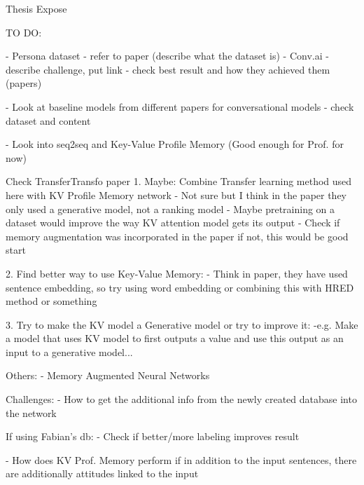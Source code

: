 Thesis Expose

TO DO:

- Persona dataset - refer to paper (describe what the dataset is)
- Conv.ai - describe challenge, put link
				- check best result and how they achieved them (papers)

				
- Look at baseline models from different papers for conversational models
	- check dataset and content 
	
- Look into seq2seq and Key-Value Profile Memory (Good enough for Prof. for now)


Check TransferTransfo paper
1. Maybe: Combine Transfer learning method used here with KV Profile Memory network
		- Not sure but I think in the paper they only used a generative model, not a ranking model
		- Maybe pretraining on a dataset would improve the way KV attention model gets its output
		- Check if memory augmentation was incorporated in the paper if not, this would be good start

2. Find better way to use Key-Value Memory:
		- Think in paper, they have used sentence embedding, so try using word embedding or combining this with HRED method or something
		
3. Try to make the KV model a Generative model or try to improve it:
		-e.g. Make a model that uses KV model to first outputs a value and use this output as an input to a generative model...
		

Others:
- Memory Augmented Neural Networks

Challenges:
- How to get the additional info from the newly created database into the network


If using Fabian's db:
- Check if better/more labeling improves result

- How does KV Prof. Memory perform if in addition to the input sentences, there are additionally attitudes linked to the input